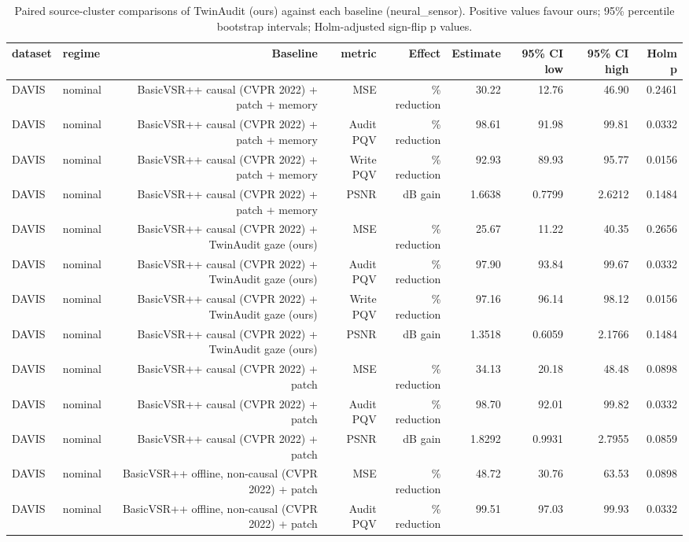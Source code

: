 \begin{table}[t]
\centering
\caption{Paired source-cluster comparisons of TwinAudit (ours) against each baseline (neural\_sensor). Positive values favour ours; 95\% percentile bootstrap intervals; Holm-adjusted sign-flip p values.}
\label{tab:paired_neural_sensor}
\small
\begin{tabular}{llrrrrrrr}
\toprule
dataset & regime & Baseline & metric & Effect & Estimate & 95\% CI low & 95\% CI high & Holm p \\
\midrule
DAVIS & nominal & BasicVSR++ causal (CVPR 2022) + patch + memory & MSE & \% reduction & 30.22 & 12.76 & 46.90 & 0.2461 \\
DAVIS & nominal & BasicVSR++ causal (CVPR 2022) + patch + memory & Audit PQV & \% reduction & 98.61 & 91.98 & 99.81 & 0.0332 \\
DAVIS & nominal & BasicVSR++ causal (CVPR 2022) + patch + memory & Write PQV & \% reduction & 92.93 & 89.93 & 95.77 & 0.0156 \\
DAVIS & nominal & BasicVSR++ causal (CVPR 2022) + patch + memory & PSNR & dB gain & 1.6638 & 0.7799 & 2.6212 & 0.1484 \\
DAVIS & nominal & BasicVSR++ causal (CVPR 2022) + TwinAudit gaze (ours) & MSE & \% reduction & 25.67 & 11.22 & 40.35 & 0.2656 \\
DAVIS & nominal & BasicVSR++ causal (CVPR 2022) + TwinAudit gaze (ours) & Audit PQV & \% reduction & 97.90 & 93.84 & 99.67 & 0.0332 \\
DAVIS & nominal & BasicVSR++ causal (CVPR 2022) + TwinAudit gaze (ours) & Write PQV & \% reduction & 97.16 & 96.14 & 98.12 & 0.0156 \\
DAVIS & nominal & BasicVSR++ causal (CVPR 2022) + TwinAudit gaze (ours) & PSNR & dB gain & 1.3518 & 0.6059 & 2.1766 & 0.1484 \\
DAVIS & nominal & BasicVSR++ causal (CVPR 2022) + patch & MSE & \% reduction & 34.13 & 20.18 & 48.48 & 0.0898 \\
DAVIS & nominal & BasicVSR++ causal (CVPR 2022) + patch & Audit PQV & \% reduction & 98.70 & 92.01 & 99.82 & 0.0332 \\
DAVIS & nominal & BasicVSR++ causal (CVPR 2022) + patch & PSNR & dB gain & 1.8292 & 0.9931 & 2.7955 & 0.0859 \\
DAVIS & nominal & BasicVSR++ offline, non-causal (CVPR 2022) + patch & MSE & \% reduction & 48.72 & 30.76 & 63.53 & 0.0898 \\
DAVIS & nominal & BasicVSR++ offline, non-causal (CVPR 2022) + patch & Audit PQV & \% reduction & 99.51 & 97.03 & 99.93 & 0.0332 \\

\end{tabular}
\end{table}
